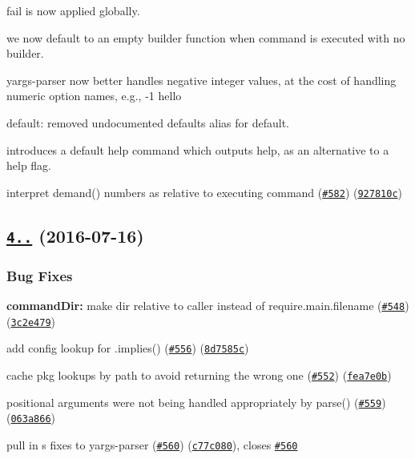 \begin{DoxyItemize}
\item fail is now applied globally.
\item we now default to an empty builder function when command is executed with no builder.
\item yargs-\/parser now better handles negative integer values, at the cost of handling numeric option names, e.\+g., -\/1 hello
\item default\+: removed undocumented {\ttfamily defaults} alias for {\ttfamily default}.
\item introduces a default {\ttfamily help} command which outputs help, as an alternative to a help flag.
\item interpret demand() numbers as relative to executing command (\href{https://github.com/yargs/yargs/issues/582}{\tt \#582}) (\href{https://github.com/yargs/yargs/commit/927810c}{\tt 927810c})
\end{DoxyItemize}

\label{_4.8.1}%
 \subsection*{\href{https://github.com/yargs/yargs/compare/v4.8.0...v4.8.1}{\tt 4..} (2016-\/07-\/16)}

\subsubsection*{Bug Fixes}


\begin{DoxyItemize}
\item {\bfseries command\+Dir\+:} make dir relative to caller instead of require.\+main.\+filename (\href{https://github.com/yargs/yargs/issues/548}{\tt \#548}) (\href{https://github.com/yargs/yargs/commit/3c2e479}{\tt 3c2e479})
\item add config lookup for .implies() (\href{https://github.com/yargs/yargs/issues/556}{\tt \#556}) (\href{https://github.com/yargs/yargs/commit/8d7585c}{\tt 8d7585c})
\item cache pkg lookups by path to avoid returning the wrong one (\href{https://github.com/yargs/yargs/issues/552}{\tt \#552}) (\href{https://github.com/yargs/yargs/commit/fea7e0b}{\tt fea7e0b})
\item positional arguments were not being handled appropriately by parse() (\href{https://github.com/yargs/yargs/issues/559}{\tt \#559}) (\href{https://github.com/yargs/yargs/commit/063a866}{\tt 063a866})
\item pull in \href{https://github.com/nexdrew}{\tt }\textquotesingle{}s fixes to yargs-\/parser (\href{https://github.com/yargs/yargs/issues/560}{\tt \#560}) (\href{https://github.com/yargs/yargs/commit/c77c080}{\tt c77c080}), closes \href{https://github.com/yargs/yargs/issues/560}{\tt \#560}
\end{DoxyItemize}

